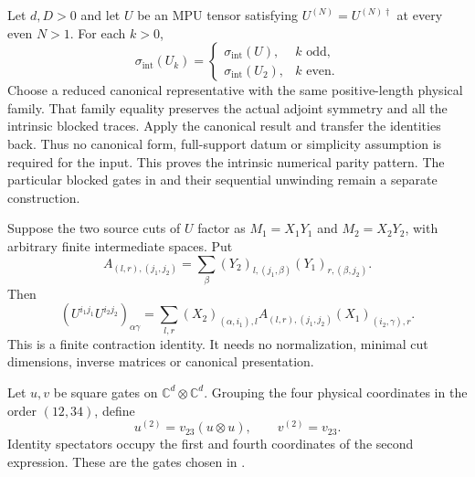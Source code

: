 \begin{lemma}
    \label{lem:mpu_intrinsic_blocking_parity}
    \leanok
    Let $d,D>0$ and let $U$ be an MPU tensor satisfying
    $U^{(N)}=U^{(N)\dagger}$ at every even $N>1$. For each $k>0$,
    \[
        \sigma_{\mathrm{int}}(U_k)=
        \begin{cases}
            \sigma_{\mathrm{int}}(U),   & k\text{ odd},  \\
            \sigma_{\mathrm{int}}(U_2), & k\text{ even}.
        \end{cases}
    \]
    Choose a reduced canonical representative with the same positive-length
    physical family. That family equality preserves the actual adjoint
    symmetry and all the intrinsic blocked traces. Apply the canonical
    result and transfer the identities back. Thus no canonical form,
    full-support datum or simplicity assumption is required for the input.
    This proves the intrinsic numerical parity pattern. The particular
    blocked gates in \cite[lines~1657--1729]{Cirac2017MPU} and their
    sequential unwinding remain a separate construction.
\end{lemma}

\begin{lemma}
    \label{lem:mpu_raw_cut_two_letter_contraction}
    \leanok
    Suppose the two source cuts of $U$ factor as $M_1=X_1Y_1$ and
    $M_2=X_2Y_2$, with arbitrary finite intermediate spaces. Put
    \[
        A_{(l,r),(j_1,j_2)}
        =\sum_\beta (Y_2)_{l,(j_1,\beta)}(Y_1)_{r,(\beta,j_2)}.
    \]
    Then
    \[
        (U^{i_1j_1}U^{i_2j_2})_{\alpha\gamma}
        =\sum_{l,r}(X_2)_{(\alpha,i_1),l}
        A_{(l,r),(j_1,j_2)}(X_1)_{(i_2,\gamma),r}.
    \]
    This is a finite contraction identity. It needs no normalization,
    minimal cut dimensions, inverse matrices or canonical presentation.
\end{lemma}

\begin{definition}
    \label{def:mpu_printed_two_block_gates}
    \leanok
    Let $u,v$ be square gates on $\mathbb C^d\otimes\mathbb C^d$.
    Grouping the four physical coordinates in the order $(12,34)$, define
    \[
        u^{(2)}=v_{23}(u\otimes u),\qquad
        v^{(2)}=v_{23}.
    \]
    Identity spectators occupy the first and fourth coordinates of the
    second expression. These are the gates chosen in
    \cite[lines~1657--1674]{Cirac2017MPU}.
\end{definition}

